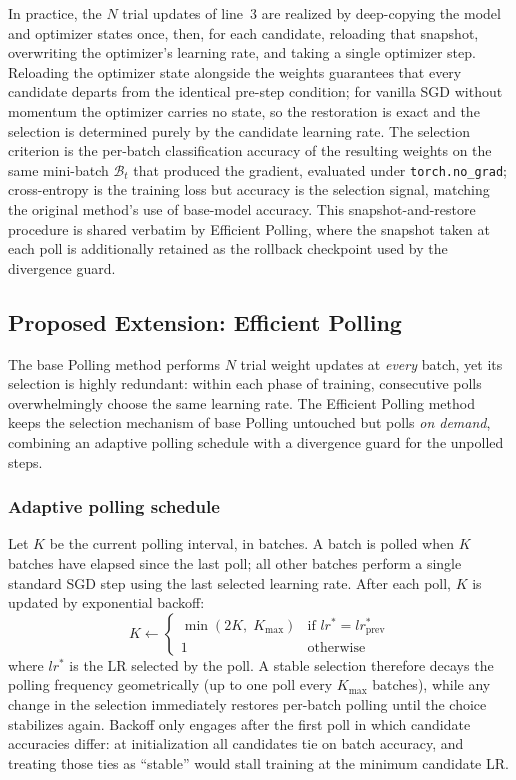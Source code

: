 \documentclass[conference]{IEEEtran}
\begin{document}
In practice, the $N$ trial updates of line~3 are realized by deep-copying the model and optimizer states once, then, for each candidate, reloading that snapshot, overwriting the optimizer's learning rate, and taking a single optimizer step. Reloading the optimizer state alongside the weights guarantees that every candidate departs from the identical pre-step condition; for vanilla SGD without momentum the optimizer carries no state, so the restoration is exact and the selection is determined purely by the candidate learning rate. The selection criterion is the per-batch classification accuracy of the resulting weights on the same mini-batch $\mathcal{B}_t$ that produced the gradient, evaluated under \texttt{torch.no\_grad}; cross-entropy is the training loss but accuracy is the selection signal, matching the original method's use of base-model accuracy. This snapshot-and-restore procedure is shared verbatim by Efficient Polling, where the snapshot taken at each poll is additionally retained as the rollback checkpoint used by the divergence guard.

\subsection{Proposed Extension: Efficient Polling}

The base Polling method performs $N$ trial weight updates at \emph{every} batch, yet its selection is highly redundant: within each phase of training, consecutive polls overwhelmingly choose the same learning rate. The Efficient Polling method keeps the selection mechanism of base Polling untouched but polls \emph{on demand}, combining an adaptive polling schedule with a divergence guard for the unpolled steps.

\subsubsection{Adaptive polling schedule}
Let $K$ be the current polling interval, in batches. A batch is polled when $K$ batches have elapsed since the last poll; all other batches perform a single standard SGD step using the last selected learning rate. After each poll, $K$ is updated by exponential backoff:
\begin{equation}
K \leftarrow
\begin{cases}
\min(2K,\; K_{\max}) & \text{if } lr^{*} = lr^{*}_{\mathrm{prev}} \\
1 & \text{otherwise}
\end{cases}
\label{eq:backoff}
\end{equation}
where $lr^{*}$ is the LR selected by the poll. A stable selection therefore decays the polling frequency geometrically (up to one poll every $K_{\max}$ batches), while any change in the selection immediately restores per-batch polling until the choice stabilizes again. Backoff only engages after the first poll in which candidate accuracies differ: at initialization all candidates tie on batch accuracy, and treating those ties as ``stable'' would stall training at the minimum candidate LR.
\end{document}

